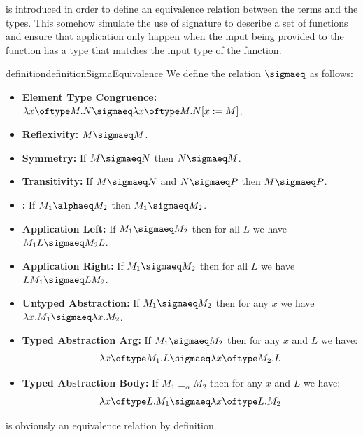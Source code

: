 \sigmaequivalence is introduced in order to define an equivalence relation between the terms and the types. This somehow simulate the use of signature to describe a set of functions and ensure that application only happen when the input being provided to the function has a type that matches the input type of the function.

\begin{reusable}{definition}{definitionSigmaEquivalence}
We define the \sigmaequivalence relation $\sigmaeq$ as follows:

    \begin{itemize}
        \item \textbf{Element Type Congruence:} $\lambda x \oftype M.N \sigmaeq \lambda x \oftype M.N[x := M]$.
        \item \textbf{Reflexivity:} $M \sigmaeq M$.
        \item \textbf{Symmetry:} If $M \sigmaeq N$ then $N \sigmaeq M$.
        \item \textbf{Transitivity:} If $M \sigmaeq N$ and $N \sigmaeq P$ then $M \sigmaeq P$.
        \item \textbf{\alphaequivalence:} If $M_1 \alphaeq M_2$ then $M_1 \sigmaeq M_2$.
        \item \textbf{Application Left:} If \( M_1 \sigmaeq M_2 \) then for all $L$ we have $M_1 L \sigmaeq M_2 L$.
        \item \textbf{Application Right:} If \( M_1 \sigmaeq M_2 \) then for all $L$ we have $L M_1 \sigmaeq L M_2$.
        \item \textbf{Untyped Abstraction:} If \( M_1 \sigmaeq M_2 \) then for any $x$ we have $\lambda x.M_1 \sigmaeq \lambda x.M_2$.
        \item \textbf{Typed Abstraction Arg:} If \( M_1 \sigmaeq M_2 \) then for any $x$ and $L$ we have:
        \[
            \lambda x \oftype M_1.L \sigmaeq \lambda x \oftype M_2.L
        \]
        \item \textbf{Typed Abstraction Body:} If \( M_1 \equiv_\alpha M_2 \) then for any $x$ and $L$ we have:
        \[
            \lambda x \oftype L.M_1 \sigmaeq \lambda x \oftype L.M_2
        \]
    \end{itemize}
\end{reusable}

\sigmaequivalence is obviously an equivalence relation by definition.